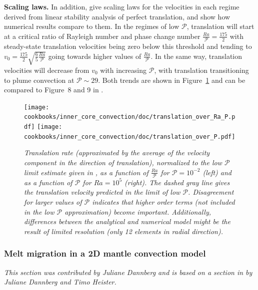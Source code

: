 \documentclass{article}
\begin{document}
\vspace{0.3cm}
\textbf{Scaling laws.}
In addition, \cite{Deguen2013} give scaling laws for the velocities in each regime derived from linear stability
analysis of perfect translation, and show how numerical results compare to them. In the regimes of low $\mathcal{P}$, translation will start
at a critical ratio of Rayleigh number and phase change number $\frac{Ra}{\mathcal{P}}=\frac{175}{2}$ with steady-state
translation velocities being zero below this threshold and tending to $v_0=\frac{175}{2}\sqrt{\frac{6}{5}\frac{Ra}{\mathcal{P}}}$
going towards higher values of $\frac{Ra}{\mathcal{P}}$.
In the same way, translation velocities will decrease from $v_0$ with increasing $\mathcal{P}$, with translation transitioning
to plume convection at $\mathcal{P}\sim29$.
Both trends are shown in Figure~\ref{fig:inner-core-trends} and can be compared to Figure~8 and 9 in \cite{Deguen2013}.

\begin{figure}
    \centering
    \texttt{[image: cookbooks/inner\_core\_convection/doc/translation\_over\_Ra\_P.pdf]}
    \hfill
    \texttt{[image: cookbooks/inner\_core\_convection/doc/translation\_over\_P.pdf]}
    \caption{\it Translation rate (approximated by the average of the velocity component in the direction of translation),
    normalized to the low $\mathcal{P}$
    limit estimate given in \cite{Deguen2013}, as a function of $\frac{Ra}{\mathcal{P}}$ for $\mathcal{P}=10^{-2}$
    (left) and as a function of $\mathcal{P}$ for $Ra=10^5$ (right).
    The dashed gray line gives the translation velocity predicted in the limit of low $\mathcal{P}$. Disagreement
    for larger values of $\mathcal{P}$ indicates that higher order terms (not included in the low $\mathcal{P}$
    approximation) become important. Additionally, differences between the analytical and numerical model might
    be the result of limited resolution (only 12 elements in radial direction).}
    \label{fig:inner-core-trends}
\end{figure}

\subsubsection{Melt migration in a 2D mantle convection model}
\label{sec:cookbooks-melt-global}

\textit{This section was contributed by Juliane Dannberg and is based on a section in \cite{dannberg_melt} by Juliane Dannberg and Timo Heister.}
\end{document}
